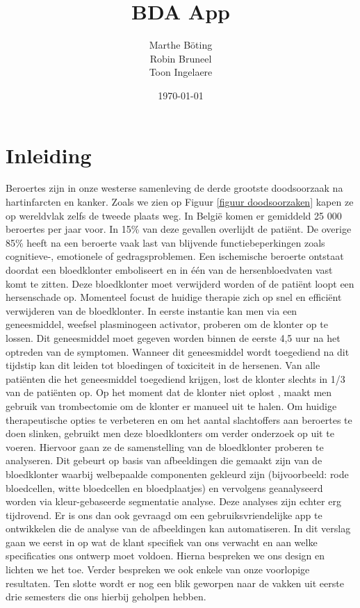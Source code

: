 \documentclass[a4paper,kulak]{kulakarticle}
\date{\today}
\title{BDA App}
\author{Marthe B\"{o}ting\\
	Robin Bruneel\\
	Toon Ingelaere}
\begin{document}
	
	
	\maketitle

\section*{Inleiding}

Beroertes zijn in onze westerse samenleving de derde grootste doodsoorzaak na hartinfarcten en kanker. Zoals we zien op Figuur \ref{figuur doodsoorzaken} kapen ze op wereldvlak zelfs de tweede plaats weg\cite{worldhealthorganization}. In België komen er gemiddeld 25 000 beroertes per jaar voor. In 15\% van deze gevallen overlijdt de patiënt. De overige 85\% heeft na een beroerte vaak last van blijvende functiebeperkingen zoals cognitieve-, emotionele of gedragsproblemen. Een ischemische beroerte ontstaat doordat een bloedklonter emboliseert en in één van de hersenbloedvaten vast komt te zitten. Deze bloedklonter moet verwijderd worden of de patiënt loopt een hersenschade op.
Momenteel focust de huidige therapie zich op snel en efficiënt verwijderen van de bloedklonter. In eerste instantie kan men via een geneesmiddel, weefsel plasminogeen activator, proberen om de klonter op te lossen. Dit geneesmiddel moet gegeven worden binnen de eerste 4,5 uur na het optreden van de symptomen. Wanneer dit geneesmiddel wordt toegediend na dit tijdstip kan dit leiden tot bloedingen of toxiciteit in de hersenen. Van alle patiënten die het geneesmiddel toegediend krijgen, lost de klonter slechts in 1/3 van de patiënten op.
Op het moment dat de klonter niet oplost , maakt men gebruik van trombectomie om de klonter er manueel uit te halen.
Om huidige therapeutische opties te verbeteren en om het aantal slachtoffers aan beroertes te doen slinken, gebruikt men deze bloedklonters om verder onderzoek op uit te voeren. Hiervoor gaan ze de samenstelling van de bloedklonter proberen te analyseren. Dit gebeurt op basis van afbeeldingen die gemaakt zijn van de bloedklonter waarbij welbepaalde componenten gekleurd zijn (bijvoorbeeld: rode bloedcellen, witte bloedcellen en bloedplaatjes) en vervolgens geanalyseerd worden via kleur-gebaseerde segmentatie analyse.
Deze analyses zijn echter erg tijdrovend. Er is ons dan ook gevraagd om een gebruiksvriendelijke app te ontwikkelen die de analyse van de afbeeldingen kan automatiseren.
In dit verslag gaan we eerst in op wat de klant specifiek van ons verwacht en aan welke specificaties ons ontwerp moet voldoen. Hierna bespreken we ons design en lichten we het toe. Verder bespreken we ook enkele van onze voorlopige resultaten. Ten slotte wordt er nog een blik geworpen naar de vakken uit eerste drie semesters die ons hierbij geholpen hebben.
\end{document}
